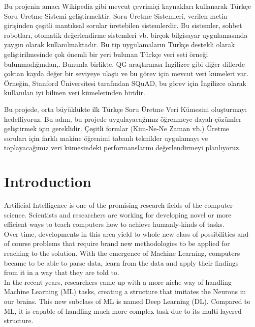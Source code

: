 \documentclass{mefsdp}
\begin{document}
		
	\begin{abstractTR}
		Bu projenin amacı Wikipedia gibi mevcut çevrimiçi kaynakları kullanarak Türkçe Soru Üretme Sistemi geliştirmektir. Soru Üretme Sistemleri, verilen metin girişinden çeşitli mantıksal sorular üretebilen sistemlerdir. Bu sistemler, sohbet robotları, otomatik değerlendirme sistemleri vb. birçok bilgisayar uygulamasında yaygın olarak kullanılmaktadır. Bu tip uygulamaların Türkçe destekli olarak geliştirilmesinde çok önemli bir yeri bulunan Türkçe veri seti örneği bulunmadığından,. Bununla birlikte, QG araştırması İngilizce gibi diğer dillerde çoktan kayda değer bir seviyeye ulaştı ve bu görev için mevcut veri kümeleri var. Örneğin, Stanford Üniversitesi tarafından SQuAD, bu görev için İngilizce olarak kullanılan iyi bilinen veri kümelerinden biridir. \newline \par
		Bu projede, orta büyüklükte ilk Türkçe Soru Üretme Veri Kümesini oluşturmayı hedefliyoruz. Bu adım, bu projede uygulayacağımız öğrenmeye dayalı çözümler geliştirmek için gereklidir. Çeşitli formlar (Kim-Ne-Ne Zaman vb.) Üretme soruları için farklı makine öğrenimi tabanlı teknikler uygulamayı ve toplayacağımız veri kümesindeki performanslarını değerlendirmeyi planlıyoruz.
		
	\end{abstractTR}
	
	\makelists

	\section{Introduction}
	Artificial Intelligence is one of the promising research fields of the computer science. Scientists and researchers are working for developing novel or more efficient ways to teach computers how to achieve humanly-kinds of tasks.\\
	
	Over time, developments in this area yield to whole new class of possibilities and of course problems that require brand new methodologies to be applied for reaching to the solution. With the emergence of Machine Learning, computers became to be able to parse data, learn from the data and apply their findings from it in a way that they are told to.\\
	
	In the recent years, researchers came up with a more niche way of handling Machine Learning (ML) tasks, creating a structure that imitates the Neurons in our brains. This new subclass of ML is named Deep Learning (DL). Compared to ML, it is capable of handling much more complex task due to its multi-layered structure.\\
	
\end{document}
